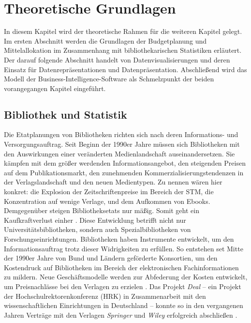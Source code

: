 \chapter{Theoretische Grundlagen}
\label{chap:two}
In diesem Kapitel wird der theoretische Rahmen für die weiteren Kapitel gelegt. Im
ersten Abschnitt werden die Grundlagen der Budgetplanung und Mittelallokation im Zusammenhang mit bibliothekarischen Statistiken erläutert. 
Der darauf folgende Abschnitt handelt von Datenvisualisierungen und deren Einsatz
für Datenrepräsentationen und Datenpräsentation. Abschließend wird das Modell der Business-Intelligence-Software als Schmelzpunkt der 
beiden vorangegangen Kapitel eingeführt.

\section{Bibliothek und Statistik}
\label{chap:two_one}
Die Etatplanungen von Bibliotheken richten sich nach deren Informations- und Versorgungsauftrag. 
Seit Beginn der 1990er Jahre müssen sich Bibliotheken mit den Auswirkungen einer veränderten Medienlandschaft auseinandersetzen.
Sie kämpfen mit dem größer werdenden Informationsangebot, den steigenden Preisen auf dem Publikationsmarkt, 
den zunehmenden Kommerzialisierungstendenzen in der Verlagslandschaft und den neuen Medientypen. 
Zu nennen wären hier konkret: die Explosion der Zeitschriftenpreise im Bereich der \acrfull{STM}, die Konzentration auf wenige Verlage, 
und dem Aufkommen von Ebooks. Demgegenüber steigen Bibliotheksetats nur mäßig. 
Somit geht ein Kaufkraftverlust einher \cite[Vgl.][164 ff.]{moravetz-kuhlmann_monika_erwerbungspolitik_2015}.
Diese Entwicklung betrifft nicht nur Universitätsbibliotheken, sondern auch Spezialbibliotheken von Forschungseinrichtungen.
Bibliotheken haben Instrumente entwickelt, um den Informationsauftrag trotz dieser Widrigkeiten zu erfüllen.
So entstehen set Mitte der 1990er Jahre von Bund und Ländern geförderte Konsortien, um den Kostendruck auf Bibliotheken im Bereich der elektronischen
Fachinformationen zu mildern. Neue Geschäftsmodelle werden zur Abfederung der Kosten entwickelt, um Preisnachlässe bei den Verlagen zu erzielen
\cite[Vgl.][169 ff.]{moravetz-kuhlmann_monika_erwerbungspolitik_2015}. Das Projekt \textit{Deal} -- ein Projekt der Hochschulrektorenkonferenz (HRK) in Zusammenarbeit mit den
wissenschaftlichen Einrichtungen in Deutschland -- konnte so in den vergangenen Jahren Verträge mit den Verlagen \textit{Springer} und \textit{Wiley} erfolgreich abschließen \cite[Vgl.][]{projekt_deal_projekt_2020}.

